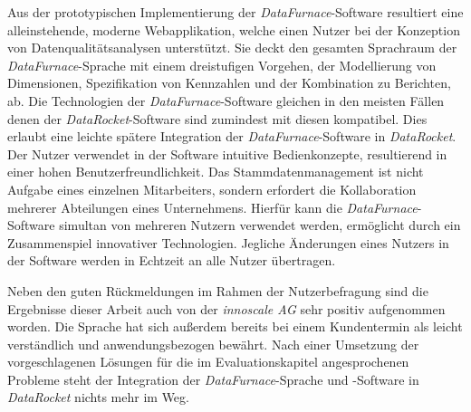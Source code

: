 \documentclass[
  language=german, %
  type=bachelor,%
  ngerman
]{isthesis}
\begin{document}
\begin{content}
Aus der prototypischen Implementierung der \textit{DataFurnace}-Software
resultiert eine alleinstehende, moderne Webapplikation, welche einen Nutzer bei
der Konzeption von Datenqualitätsanalysen unterstützt. Sie deckt den gesamten
Sprachraum der \textit{DataFurnace}-Sprache mit einem dreistufigen Vorgehen,
der Modellierung von Dimensionen, Spezifikation von Kennzahlen und der
Kombination zu Berichten, ab. Die Technologien der
\textit{DataFurnace}-Software gleichen in den meisten Fällen denen der
\textit{DataRocket}-Software \bzw{} sind zumindest mit diesen kompatibel. Dies
erlaubt eine leichte spätere Integration der \textit{DataFurnace}-Software in
\textit{DataRocket}. Der Nutzer verwendet in der Software intuitive
Bedienkonzepte, resultierend in einer hohen Benutzerfreundlichkeit. Das
Stammdatenmanagement ist nicht Aufgabe eines einzelnen Mitarbeiters, sondern
erfordert die Kollaboration mehrerer Abteilungen eines Unternehmens. Hierfür
kann die \textit{DataFurnace}-Software simultan von mehreren Nutzern verwendet
werden, ermöglicht durch ein Zusammenspiel innovativer Technologien.  Jegliche
Änderungen eines Nutzers in der Software werden in Echtzeit an alle Nutzer
übertragen.

Neben den guten Rückmeldungen im Rahmen der Nutzerbefragung sind die Ergebnisse
dieser Arbeit auch von der \textit{innoscale AG} sehr positiv aufgenommen
worden.  Die Sprache hat sich außerdem bereits bei einem Kundentermin als
leicht verständlich und anwendungsbezogen bewährt. Nach einer Umsetzung der
vorgeschlagenen Lösungen für die im Evaluationskapitel angesprochenen Probleme
steht der Integration der \textit{DataFurnace}-Sprache und -Software in
\textit{DataRocket} nichts mehr im Weg.



\end{content}









\authorshipstatement[pagenumbering=true]

\end{document}
